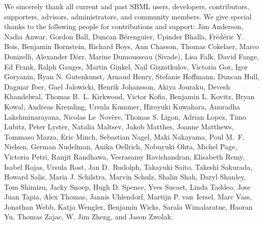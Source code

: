 \documentclass{sbml-paper}
\begin{document}
We sincerely thank all current and past SBML users, developers, contributors, supporters, advisors, administrators, and community members.  We give special thanks to the following people for contributions and support:
Jim Anderson,
Nadia Anwar,
Gordon Ball,
Duncan B\'{e}renguier,
Upinder Bhalla,
Fr\'{e}d\'{e}ric Y. Bois,
Benjamin Bornstein,
Richard Boys,
Ann Chasson,
Thomas Cokelaer,
Marco Donizelli,
Alexander D\"{o}rr,
Marine Dumousseau (Sivade),
Lisa Falk,
David Fange,
Ed Frank,
Ralph Gauges,
Martin Ginkel,
Nail Gizzatkulov,
Victoria Gor,
Igor Goryanin,
Ryan N. Gutenkunst,
Arnaud Henry,
Stefanie Hoffmann,
Duncan Hull,
Dagmar Iber,
Gael Jalowicki,
Henrik Johansson,
Akiya Jouraku,
Devesh Khandelwal,
Thomas B.~L. Kirkwood,
Victor Kofia,
Benjamin L. Kovitz,
Bryan Kowal,
Andreas Kremling,
Ursula Kummer,
Hiroyuki Kuwahara,
Anuradha Lakshminarayana,
Nicolas Le~Nov\`{e}re,
Thomas S. Ligon,
Adrian Lopez,
Timo Lubitz,
Peter Lyster,
Natalia Maltsev,
Jakob Matthes,
Joanne Matthews,
Tommaso Mazza,
Eric Minch,
Sebastian Nagel,
Maki Nakayama,
Poul M.~F. Nielsen,
German Nudelman,
Anika Oellrich,
Nobuyuki Ohta,
Michel Page,
Victoria Petri,
Ranjit Randhawa,
Veerasamy Ravichandran,
Elisabeth Remy,
Isabel Rojas,
Ursula Rost,
Jan D.~Rudolph,
Takayuki Saito,
Takeshi Sakurada,
Howard Salis,
Maria J. Schilstra,
Marvin Schulz,
Shalin Shah,
Daryl Shanley,
Tom Shimizu,
Jacky Snoep,
Hugh D. Spence,
Yves Sucaet,
Linda Taddeo,
Jose Juan Tapia,
Alex Thomas,
Jannis Uhlendorf,
Martijn P. van~Iersel,
Marc Vass,
Jonathan Webb,
Katja Wengler,
Benjamin Wicks,
Sarala Wimalaratne,
Haoran Yu,
Thomas Zajac,
W. Jim Zheng,
and Jason Zwolak.
\end{document}
